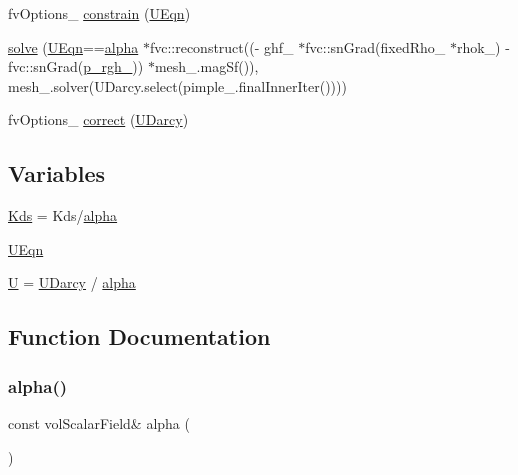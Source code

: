 \begin{DoxyCompactItemize}
\item 
fv\+Options\+\_\+ \hyperlink{UEqn__1pl_8H_a4e872a8c8b6f73bb9552fce412103c89}{constrain} (\hyperlink{UEqn__1pl_8H_afd1b8693a3c3032de396035e7045d467}{U\+Eqn})
\item 
\hyperlink{UEqn__1pl_8H_a07e4add2a2b8e3ede321e044739a731e}{solve} (\hyperlink{UEqn__1pl_8H_afd1b8693a3c3032de396035e7045d467}{U\+Eqn}==\hyperlink{UEqn__1pl_8H_a7fe02434a19f3e00e927f32adcbb193b}{alpha} $\ast$fvc\+::reconstruct((-\/ ghf\+\_\+ $\ast$fvc\+::sn\+Grad(fixed\+Rho\+\_\+ $\ast$rhok\+\_\+) -\/ fvc\+::sn\+Grad(\hyperlink{updatePP__rghRho__2p_8H_a320090d1a3c1675778a59e981765c77c}{p\+\_\+rgh\+\_\+})) $\ast$mesh\+\_\+.\+mag\+Sf()), mesh\+\_\+.\+solver(U\+Darcy.\+select(pimple\+\_\+.\+final\+Inner\+Iter())))
\item 
fv\+Options\+\_\+ \hyperlink{UEqn__1pl_8H_afa0df6b40b0ce36874c336f10f03a407}{correct} (\hyperlink{UEqn__1pl_8H_a128902f421bd168fd4996f177e0a59ad}{U\+Darcy})
\end{DoxyCompactItemize}
\subsection*{Variables}
\begin{DoxyCompactItemize}
\item 
\hyperlink{UEqn__1pl_8H_a1de2ec75382b1cf038f07c3bb9d58957}{Kds} = Kds/\hyperlink{UEqn__1pl_8H_a7fe02434a19f3e00e927f32adcbb193b}{alpha}
\item 
\hyperlink{UEqn__1pl_8H_a7a16102cab1f7398d9732830aeb173bc}{U\+Eqn}
\item 
\hyperlink{UEqn__1pl_8H_a81cf6107131a3583e2b0b762cb9c2862}{U} = \hyperlink{UEqn__1pl_8H_a128902f421bd168fd4996f177e0a59ad}{U\+Darcy} / \hyperlink{UEqn__1pl_8H_a7fe02434a19f3e00e927f32adcbb193b}{alpha}
\end{DoxyCompactItemize}


\subsection{Function Documentation}
\mbox{\label{UEqn__1pl_8H_a7fe02434a19f3e00e927f32adcbb193b}} 
\subsubsection{\texorpdfstring{alpha()}{alpha()}}
{\footnotesize\ttfamily const vol\+Scalar\+Field\& alpha (\begin{DoxyParamCaption}\item[{fluid\+\_\+}]{ }\end{DoxyParamCaption})}

